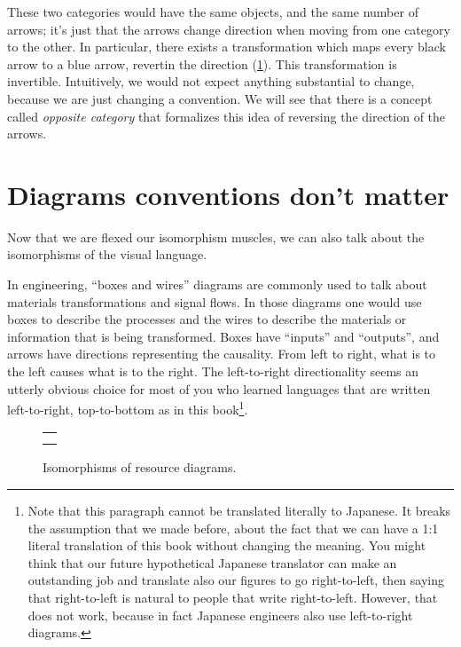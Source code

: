 These two categories would have the same objects, and the same number of arrows; it's just that the arrows change direction when moving from one category to the other.
In particular, there exists a transformation which maps every black arrow to a blue arrow, revertin the direction (\cref{fig:inverted_2}).
This transformation is invertible.
Intuitively, we would not expect anything substantial to change, because we are just changing a convention.
We will see that there is a concept called \emph{opposite category} that formalizes this idea of reversing the direction of the arrows.

\begin{figure}[h!]
	\centering
	\caption{}
	\label{fig:inverted_2}
\end{figure}

\section[Diagram conventions]{Diagrams conventions don't matter}

Now that we are flexed our isomorphism muscles, we can also talk about the isomorphisms of the visual language.

In engineering, ``boxes and wires'' diagrams are commonly used to talk about materials transformations and signal flows.
In those diagrams one would use boxes to describe the processes and the wires to describe the materials or information that is being transformed.
Boxes have ``inputs'' and ``outputs'', and arrows have directions representing the causality.
From left to right, what is to the left causes what is to the right.
The left-to-right directionality seems an utterly obvious choice for most of you who learned languages that are written left-to-right, top-to-bottom as in this book\footnote{
	Note that this paragraph cannot be translated literally to Japanese.
	It breaks the assumption that we made before, about the fact that we can have a 1:1 literal translation of this book without changing the meaning.
	You might think that our future hypothetical Japanese translator can make an outstanding job and translate also our figures to go right-to-left, then saying that right-to-left is natural to people that write right-to-left.
	However, that does not work, because in fact Japanese engineers also use left-to-right diagrams.
}.

\begin{figure}[h!]
	\centering
	\begin{tabular}{c}
		{20_iso_diags_1} \\
		{20_iso_diags_2}
	\end{tabular}
	\caption{Isomorphisms of resource diagrams.  }
	\label{fig:isodiagrams}
\end{figure}


